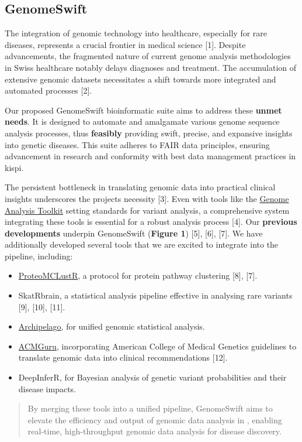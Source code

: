 \subsection{GenomeSwift}\label{GenomeSwift}

The integration of genomic technology into healthcare, especially for
rare diseases, represents a crucial frontier in medical science {[}1{]}.
Despite advancements, the fragmented nature of current genome analysis
methodologies in Swiss healthcare notably delays diagnoses and
treatment. The accumulation of extensive genomic datasets necessitates a
shift towards more integrated and automated processes {[}2{]}.

Our proposed GenomeSwift bioinformatic suite aims to address these
\textbf{unmet needs}. It is designed to automate and amalgamate various
genome sequence analysis processes, thus \textbf{feasibly} providing
swift, precise, and expansive insights into genetic diseases. This suite
adheres to FAIR data principles, ensuring advancement in research and
conformity with best data management practices in \\kispi.

The persistent bottleneck in translating genomic data into practical
clinical insights underscores the project\textquotesingle s necessity
{[}3{]}. Even with tools like the
\href{https://gatk.broadinstitute.org/hc/en-us}{Genome Analysis Toolkit}
setting standards for variant analysis, a comprehensive system
integrating these tools is essential for a robust analysis process
{[}4{]}. Our \textbf{previous developments} underpin GenomeSwift
(\textbf{Figure 1}) {[}5{]}, {[}6{]}, {[}7{]}. We have additionally
developed several tools that we are excited to integrate into the
pipeline, including:

\begin{itemize}
\item
  \href{https://github.com/DylanLawless/ProteoMCLustR}{ProteoMCLustR}, a
  protocol for protein pathway clustering {[}8{]}, {[}7{]}.
\item
  SkatRbrain, a statistical analysis pipeline effective in analysing
  rare variants {[}9{]}, {[}10{]}, {[}11{]}.
\item
  \href{https://github.com/DylanLawless/archipelago}{Archipelago}, for
  unified genomic statistical analysis.
\item
  \href{https://github.com/DylanLawless/ACMGuru}{ACMGuru}, incorporating
  American College of Medical Genetics guidelines to translate genomic
  data into clinical recommendations {[}12{]}.
\item
  DeepInferR, for Bayesian analysis of genetic variant probabilities and
  their disease impacts.
\end{itemize}

\begin{quote}
By merging these tools into a unified pipeline, GenomeSwift aims to
elevate the efficiency and output of genomic data analysis in \kispi,
enabling real-time, high-throughput genomic data analysis for disease
discovery.
\end{quote}
